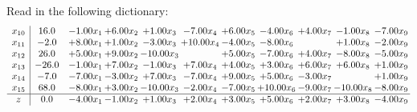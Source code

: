 \documentclass[9pt]{article}
\begin{document}
Read in the following dictionary:
\[\begin{array}{c| c c@{\hskip 2pt} c@{\hskip 2pt} c@{\hskip 2pt} c@{\hskip 2pt} c@{\hskip 2pt} c@{\hskip 2pt} c@{\hskip 2pt} c@{\hskip 2pt} c@{\hskip 2pt} }
 x_{10}   &  16.0 & -1.00 x_{1} & +  6.00 x_{2} & +  1.00 x_{3} & -7.00 x_{4} & +  6.00 x_{5} & -4.00 x_{6} & +  4.00 x_{7} & -1.00 x_{8} & -7.00 x_{9}\\
 x_{11}   &  -2.0 & +  8.00 x_{1} & +  1.00 x_{2} & -3.00 x_{3} & + 10.00 x_{4} & -4.00 x_{5} & -8.00 x_{6} &   & +  1.00 x_{8} & -2.00 x_{9}\\
 x_{12}   &  26.0 & +  5.00 x_{1} & +  9.00 x_{2} & -10.00 x_{3} &   & +  5.00 x_{5} & -7.00 x_{6} & +  4.00 x_{7} & -8.00 x_{8} & -5.00 x_{9}\\
 x_{13}   &  -26.0 & -1.00 x_{1} & +  7.00 x_{2} & -1.00 x_{3} & +  7.00 x_{4} & +  4.00 x_{5} & +  3.00 x_{6} & +  6.00 x_{7} & +  6.00 x_{8} & +  1.00 x_{9}\\
 x_{14}   &  -7.0 & -7.00 x_{1} & -3.00 x_{2} & +  7.00 x_{3} & -7.00 x_{4} & +  9.00 x_{5} & +  5.00 x_{6} & -3.00 x_{7} &   & +  1.00 x_{9}\\
 x_{15}   &  68.0 & -8.00 x_{1} & +  3.00 x_{2} & -10.00 x_{3} & -2.00 x_{4} & -7.00 x_{5} & + 10.00 x_{6} & -9.00 x_{7} & -10.00 x_{8} & -8.00 x_{9}\\
\hline
z    &  0.0 & -4.00 x_{1} & -1.00 x_{2} & +  1.00 x_{3} & +  2.00 x_{4} & +  3.00 x_{5} & +  5.00 x_{6} & +  2.00 x_{7} & +  3.00 x_{8} & -4.00 x_{9}\\
\end{array}\]
\end{document}
